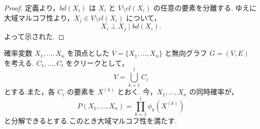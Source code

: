 \documentclass[uplatex, dvipdfmx]{jsarticle}
\begin{document}
\begin{proof}
  定義より，$bd(X_i)$ は $X_i$ と $V \setminus cl(X_i)$ の任意の要素を分離する.
  ゆえに大域マルコフ性より，$X_j \in V \setminus cl(X_i)$ について，
  \begin{equation*}
      X_i \perp X_j \mid bd(X_i).
  \end{equation*}
  よって示された.
\end{proof}

\begin{thm}[label={thm:CliqueFactor}]{}
  確率変数 $X_1, \dots, X_n$ を頂点とした $V = \{X_1, \dots, X_n\}$ と無向グラフ $G = (V, E)$ を考える.
  $C_1, \dots, C_l$ をクリークとして，
  \begin{equation}
      V = \bigcup_{k=1}^l C_i
  \end{equation}
  とする.また，各 $C_i$ の要素を $X^{(k)}$ とおく.
  今，$X_1, \dots, X_n$ の同時確率が，
  \begin{equation}
      P(X_1, \dots, X_n) = \prod_{k=1}^l \phi_k(X^{(k)})
  \end{equation}
  と分解できるとする.このとき大域マルコフ性を満たす.
\end{thm}
\end{document}

